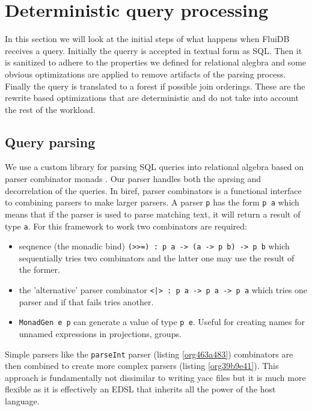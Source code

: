 \section{Deterministic query processing}
\label{sec:orgb65466e}
In this section we will look at the initial steps of what happens when
FluiDB receives a query. Initially the querry is accepted in textual
form as SQL. Then it is sanitized to adhere to the properties we
defined for relational alegbra and some obvious optimizations are
applied to remove artifacts of the parsing process. Finally the query
is translated to a forest if possible join orderings. These are the
rewrite based optimizations that are deterministic and do not take
into account the rest of the workload.

\subsection{Query parsing}
\label{sec:org860b230}
We use a custom library for parsing SQL queries into relational
algebra based on parser combinator monads
\cite{leijenParsecDirectStyle}. Our parser handles both the aprsing and
decorrelation of the queries. In biref, parser combinators is a
functional interface to combining parsers to make larger parsers. A
parser \texttt{p} has the form \texttt{p a} which means that if the parser is used
to parse matching text, it will return a result of type \texttt{a}. For this
framework to work two combinators are required:

\begin{itemize}
\item seqnence (the monadic bind) \texttt{(>>=) : p a -> (a -> p b) -> p b}
  which sequentially tries two combinators and the latter one may use
  the result of the former.
\item the 'alternative' parser combinator \texttt{<|> : p a -> p a -> p a} which
  tries one parser and if that fails tries another.
\item \texttt{MonadGen e p} can generate a value of type \texttt{p e}. Useful for creating
  names for unnamed expressions in projections, groups.
\end{itemize}

Simple parsers like the \texttt{parseInt} parser (listing \ref{org463a483})
combinators are then combined to create more complex parsers (listing
\ref{org39b9e41}). This approach is fundamentally not dissimilar to
writing yacc files but it is much more flexible as it is effectively
an EDSL that inherits all the power of the host language.

